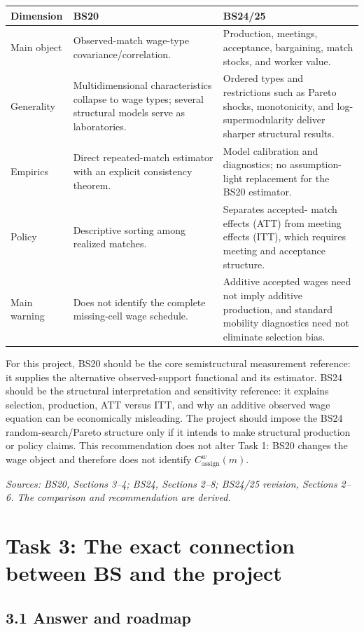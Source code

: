 \documentclass[11pt]{article}
\begin{document}
\begin{longtable}{p{}p{}p{}}
\textbf{Dimension} & \textbf{BS20} & \textbf{BS24/25} \\
\hline
Main object & Observed-match wage-type covariance/correlation. &
Production, meetings, acceptance, bargaining, match stocks, and worker
value. \\
Generality & Multidimensional characteristics collapse to wage types; several
structural models serve as laboratories. & Ordered types and restrictions
such as Pareto shocks, monotonicity, and log-supermodularity deliver sharper
structural results. \\
Empirics & Direct repeated-match estimator with an explicit consistency
theorem. & Model calibration and diagnostics; no assumption-light replacement
for the BS20 estimator. \\
Policy & Descriptive sorting among realized matches. & Separates accepted-
match effects (ATT) from meeting effects (ITT), which requires meeting and
acceptance structure. \\
Main warning & Does not identify the complete missing-cell wage schedule. &
Additive accepted wages need not imply additive production, and standard
mobility diagnostics need not eliminate selection bias. \\
\end{longtable}

For this project, BS20 should be the core semistructural measurement
reference: it supplies the alternative observed-support functional and its
estimator.  BS24 should be the structural interpretation and sensitivity
reference: it explains selection, production, ATT versus ITT, and why an
additive observed wage equation can be economically misleading.  The project
should impose the BS24 random-search/Pareto structure only if it intends to
make structural production or policy claims.  This recommendation does not
alter Task 1: BS20 changes the wage object and therefore does not identify
\(C^w_{\mathrm{assign}}(m)\).

\textit{Sources: BS20, Sections 3--4; BS24, Sections 2--8; BS24/25 revision,
Sections 2--6.  The comparison and recommendation are derived.}

\section{Task 3: The exact connection between BS and the project}

\subsection{3.1 Answer and roadmap}
\end{document}
